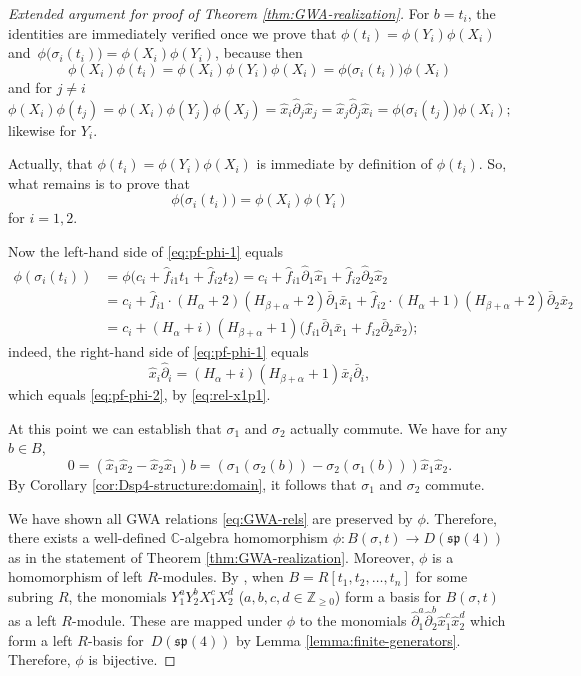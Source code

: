 \documentclass[10pt,a4paper]{amsart}
\numberwithin{equation}{section}
\begin{document}
\begin{proof}[Extended argument for proof of Theorem \ref{thm:GWA-realization}]
	For $b=t_i$, the identities are immediately verified once we prove that $\phi(t_i)=\phi(Y_i)\phi(X_i)$ and~${\phi\big(\sigma_i(t_i)\big)=\phi(X_i)\phi(Y_i)}$, because then
	\[\phi(X_i)\phi(t_i)=\phi(X_i)\phi(Y_i)\phi(X_i)=\phi\big(\sigma_i(t_i)\big)\phi(X_i)\]
	and for $j\neq i$
	\[ \phi(X_i)\phi(t_j)=\phi(X_i)\phi(Y_j)\phi(X_j)=\hat{x}_i\hat{\partial}_j\hat{x}_j=\hat{x}_j\hat{\partial}_j\hat{x}_i=\phi\big(\sigma_i(t_j)\big)\phi(X_i);\]
	likewise for $Y_i$.
	
	Actually, that $\phi(t_i)=\phi(Y_i)\phi(X_i)$ is immediate by definition of $\phi(t_i)$. So, what remains is to prove that
	\begin{equation}\label{eq:pf-phi-1}
		\phi\big(\sigma_i(t_i))=\phi(X_i)\phi(Y_i)
	\end{equation}
	for $i=1,2$.
	
	Now the left-hand side of \eqref{eq:pf-phi-1} equals
	\begin{align}
		\phi(\sigma_i(t_i))&=\phi\bigl(c_i+\hat f_{i1}t_1+\hat f_{i2}t_2\bigr)=c_i+\hat f_{i1}\hat{\partial}_1\hat{x}_1+\hat f_{i2}\hat{\partial}_2\hat{x}_2 \nonumber\\
		&=c_i+\hat f_{i1}\cdot(H_\alpha+2)(H_{\beta+\alpha}+2)\bar{\partial}_1\bar{x}_1+\hat f_{i2}\cdot (H_\alpha+1)(H_{\beta+\alpha}+2)\bar{\partial}_2\bar{x}_2\nonumber\\
		&=c_i+(H_\alpha+i)(H_{\beta+\alpha}+1)\bigl(f_{i1}\bar{\partial}_1\bar{x}_1+f_{i2}\bar{\partial}_2\bar{x}_2\bigr);\label{eq:pf-phi-2}
	\end{align}
	indeed, the right-hand side of \eqref{eq:pf-phi-1} equals
	\[\hat{x}_i\hat{\partial}_i=(H_\alpha+i)(H_{\beta+\alpha}+1)\bar{x}_i\bar{\partial}_i,\]
	which equals \eqref{eq:pf-phi-2}, by \eqref{eq:rel-x1p1}.
	
	At this point we can establish that $\sigma_1$ and $\sigma_2$ actually commute.
	We have for any $b\in B$,
	\[0=(\hat{x}_1\hat{x}_2 -\hat{x}_2\hat{x}_1)b = (\sigma_1(\sigma_2(b))-\sigma_2(\sigma_1(b)))\hat{x}_1\hat{x}_2.\]
	By Corollary \ref{cor:Dsp4-structure:domain}, it follows that $\sigma_1$ and $\sigma_2$ commute.
	
	We have shown all GWA relations \eqref{eq:GWA-rels} are preserved by $\phi$. Therefore, there exists a well-defined $\mathbb{C}$-algebra homomorphism $\phi\colon B(\sigma,t)\to D(\mathfrak{sp}(4))$ as in the statement of Theorem \ref{thm:GWA-realization}. Moreover, $\phi$ is a homomorphism of left $R$-modules.
	By \cite{bavula1992generalized}, when $B=R[t_1,t_2,\dots,t_n]$ for some subring $R$, the monomials $Y_1^aY_2^bX_1^cX_2^d$ ($a,b,c,d\in\mathbb{Z}_{\geq 0}$) form a basis for $B(\sigma,t)$ as a left $R$-module. These are mapped under $\phi$ to the monomials $\hat{\partial}_1^a\hat{\partial}_2^b\hat{x}_1^c\hat{x}_2^d$ which form a left $R$-basis for~$D(\mathfrak{sp}(4))$ by Lemma \ref{lemma:finite-generators}.
	Therefore, $\phi$ is bijective.
\end{proof}
\end{document}
